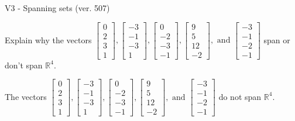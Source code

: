 \begin{exercise}
  \begin{exerciseTitle}V3 - Spanning sets (ver. 507)\end{exerciseTitle}
  \begin{exerciseStatement}
    Explain why the vectors \(\left[\begin{array}{r}
0 \\
2 \\
3 \\
1
\end{array}\right] , \left[\begin{array}{r}
-3 \\
-1 \\
-3 \\
1
\end{array}\right] , \left[\begin{array}{r}
0 \\
-2 \\
-3 \\
-1
\end{array}\right] , \left[\begin{array}{r}
9 \\
5 \\
12 \\
-2
\end{array}\right] , \text{ and } \left[\begin{array}{r}
-3 \\
-1 \\
-2 \\
-1
\end{array}\right]\) span or don't span \(\mathbb{R}^4\). 
	


  \end{exerciseStatement}
  \begin{exerciseAnswer}
   The vectors \(\left[\begin{array}{r}
0 \\
2 \\
3 \\
1
\end{array}\right] , \left[\begin{array}{r}
-3 \\
-1 \\
-3 \\
1
\end{array}\right] , \left[\begin{array}{r}
0 \\
-2 \\
-3 \\
-1
\end{array}\right] , \left[\begin{array}{r}
9 \\
5 \\
12 \\
-2
\end{array}\right] , \text{ and } \left[\begin{array}{r}
-3 \\
-1 \\
-2 \\
-1
\end{array}\right]\) 
  	 do not  
	span \(\mathbb{R}^4\).
  



\end{exerciseAnswer}
\end{exercise}
